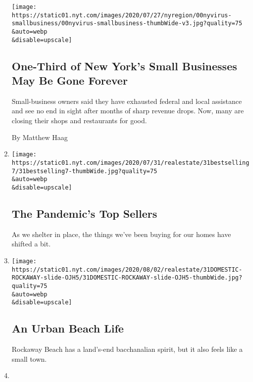 \begin{enumerate}
  \texttt{[image: https://static01.nyt.com/images/2020/07/27/nyregion/00nyvirus-smallbusiness/00nyvirus-smallbusiness-thumbWide-v3.jpg?quality=75\\\&auto=webp\\\&disable=upscale]}

  \hypertarget{one-third-of-new-yorks-small-businesses-may-be-gone-forever}{%
  \subsection{One-Third of New York's Small Businesses May Be Gone
  Forever}\label{one-third-of-new-yorks-small-businesses-may-be-gone-forever}}

  Small-business owners said they have exhausted federal and local
  assistance and see no end in sight after months of sharp revenue
  drops. Now, many are closing their shops and restaurants for good.

  By Matthew Haag
\item
  \href{/slideshow/2020/07/31/realestate/the-pandemics-top-sellers.html}{}

  \texttt{[image: https://static01.nyt.com/images/2020/07/31/realestate/31bestselling7/31bestselling7-thumbWide.jpg?quality=75\\\&auto=webp\\\&disable=upscale]}

  \hypertarget{the-pandemics-top-sellers}{%
  \subsection{The Pandemic's Top
  Sellers}\label{the-pandemics-top-sellers}}

  As we shelter in place, the things we've been buying for our homes
  have shifted a bit.
\item
  \href{/slideshow/2020/07/31/realestate/an-urban-beach-life.html}{}

  \texttt{[image: https://static01.nyt.com/images/2020/08/02/realestate/31DOMESTIC-ROCKAWAY-slide-OJH5/31DOMESTIC-ROCKAWAY-slide-OJH5-thumbWide.jpg?quality=75\\\&auto=webp\\\&disable=upscale]}

  \hypertarget{an-urban-beach-life}{%
  \subsection{An Urban Beach Life}\label{an-urban-beach-life}}

  Rockaway Beach has a land's-end bacchanalian spirit, but it also feels
  like a small town.
\item
  \href{/slideshow/2020/07/30/realestate/on-the-market-in-the-new-york-region.html}{}


\end{enumerate}
